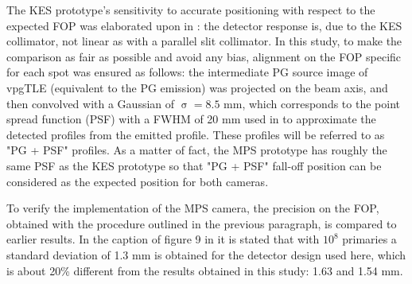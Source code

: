 \documentclass[a4paper,english,12pt]{article}
\begin{document}
The KES prototype's sensitivity to accurate positioning with respect to the expected FOP was elaborated upon in \citet[Section IV.A.3]{Sterpin2015}: the detector response is, due to the KES collimator, not linear as with a parallel slit collimator. In this study, to make the comparison as fair as possible and avoid any bias, alignment on the FOP specific for each spot was ensured as follows: the intermediate PG source image of vpgTLE (equivalent to the PG emission) was projected on the beam axis, and then convolved with a Gaussian of $\upsigma = 8.5$ mm, which corresponds to the point spread function (PSF) with a FWHM of 20 mm used in \cite{Priegnitz2015} to approximate the detected profiles from the emitted profile. These profiles will be referred to as "PG + PSF" profiles. As a matter of fact, the MPS prototype has roughly the same PSF as the KES prototype so that "PG + PSF" fall-off position can be considered as the expected position for both cameras.

To verify the implementation of the MPS camera, the precision on the FOP, obtained with the procedure outlined in the previous paragraph, is compared to earlier results. In the caption of figure 9 in \cite{Pinto2014a} it is stated that with $10^8$ primaries a standard deviation of 1.3 mm is obtained for the detector design used here, which is about 20\% different from the results obtained in this study: 1.63 and 1.54 mm.
\newpage




\end{document}
